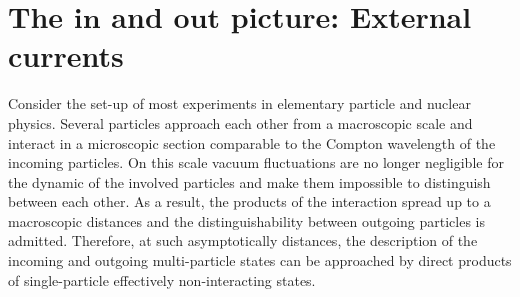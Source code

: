 \documentclass[
11pt, %
english, %
singlespacing, %
headsepline, %
]{MastersDoctoralThesis} %
\begin{document}
\section{The $ \pmb{in} $ and $ \pmb{out}$ picture: External currents}\label{in_out_picture_external_currents}
Consider the set-up of most experiments in elementary particle and nuclear physics. Several particles approach each other from a macroscopic scale and interact in a microscopic section comparable to the Compton wavelength of the incoming particles. On this scale vacuum fluctuations are no longer negligible for the dynamic of the involved particles and make them impossible to distinguish between each other. As a result, the products of the interaction spread up to a macroscopic distances and the distinguishability between outgoing particles is admitted. Therefore, at such asymptotically distances, the description of the incoming and outgoing multi-particle states can be approached by direct products of single-particle effectively non-interacting states.
\end{document}
